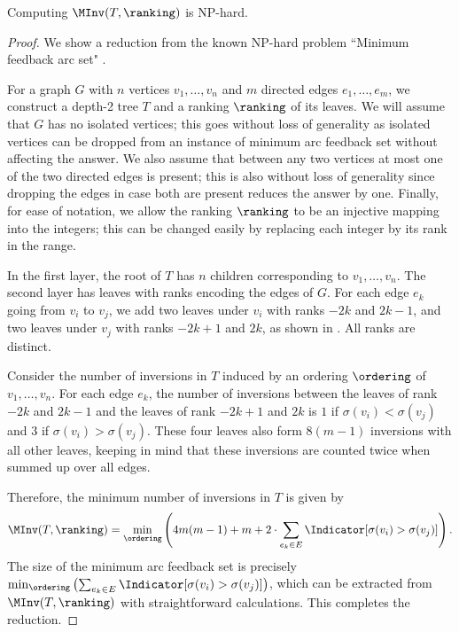 \documentclass{toc}
\begin{document}
\begin{proposition}
    Computing $\MInv(T,\ranking)$ is NP-hard.
\end{proposition}

\begin{proof}
%
%
%
%
%
%
%
    We show a reduction from the known NP-hard problem ``Minimum feedback arc set" \cite{Karp1972}.

    For a graph $G$ with $n$ vertices $v_1,\dots,v_n$ and $m$ directed edges $e_1,\dots,e_m$, we construct a depth-2 tree $T$ and a ranking $\ranking$ of its leaves. We will assume that $G$ has no isolated vertices; this goes without loss of generality as isolated vertices can be dropped from an instance of minimum arc feedback set without affecting the answer. We also assume that between any two vertices at most one of the two directed edges is present; this is also without loss of generality since dropping the edges in case both are present reduces the answer by one. Finally, for ease of notation, we allow the ranking $\ranking$ to be an injective mapping into the integers; this can be changed easily by replacing each integer by its rank in the range.
        
    In the first layer, the root of $T$ has $n$ children corresponding to $v_1,\dots,v_n$. The second layer has leaves with ranks encoding the edges of $G$. For each edge $e_k$ going from $v_i$ to $v_j$, we add two leaves under $v_i$ with ranks $-2k$ and $2k-1$, and two leaves under $v_j$ with ranks $-2k+1$ and $2k$, as shown in . All ranks are distinct.
    
    Consider the number of inversions in $T$ induced by an ordering $\ordering$ of $v_1,\dots,v_n$. For each edge $e_k$, the number of inversions between the leaves of rank $-2k$ and $2k-1$ and the leaves of rank $-2k+1$ and $2k$ is $1$ if $\sigma(v_i)<\sigma(v_j)$ and $3$ if $\sigma(v_i)>\sigma(v_j)$. These four leaves also form $8(m-1)$ inversions with all other leaves, keeping in mind that these inversions are counted twice when summed up over all edges.
    
    Therefore, the minimum number of inversions in $T$ is given by
    \begin{equation*}
        \MInv(T,\ranking)=\min_{\ordering} \left(4m(m-1)+m+ 2\cdot\sum_{e_k\in E}\Indicator[\sigma(v_i)>\sigma(v_j)]\right).
    \end{equation*}
    The size of the minimum arc feedback set is precisely $\min_{\ordering} \left( \sum_{e_k\in E}\Indicator[\sigma(v_i)>\sigma(v_j)] \right)$, which can be extracted from $\MInv(T,\ranking)$ with straightforward calculations. This completes the reduction.
\end{proof}
\end{document}

